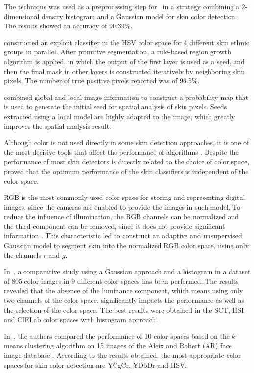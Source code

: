 The technique was used as a preprocessing step for~\citet{tan:12} in a strategy combining a $2$-dimensional density histogram and a Gaussian model for skin color detection. The results showed an accuracy of 90.39\%.

\citet{naji:12} constructed an explicit classifier in the HSV color space for 4 different skin ethnic groups in parallel. After primitive segmentation, a rule-based region growth algorithm is applied, in which the output of the first layer is used as a seed, and then the final mask in other layers is constructed iteratively by neighboring skin pixels. The number of true positive pixels reported was of 96.5\%.

\citet{kawulok:13} combined global and local image information to construct a probability map that is used to generate the initial seed for spatial analysis of skin pixels. Seeds extracted using a local model are highly adapted to the image, which greatly improves the spatial analysis result.

Although color is not used directly in some skin detection approaches, it is one of the most decisive tools that affect the performance of algorithms \citep{mahmoodi:16}. Despite the performance of most skin detectors is directly related to the choice of color space, \citet{albiol:01} proved that the optimum performance of the skin classifiers is independent of the color space.

RGB is the most commonly used color space for storing and representing digital images, since the cameras are enabled to provide the images in such model. To reduce the influence of illumination, the RGB channels can be normalized and the third component can be removed, since it does not provide significant information \citep{kakumanu:07}. This characteristic led \citet{bergasa:00} to construct an adaptive and unsupervised Gaussian model to segment skin into the normalized RGB color space, using only the channels $r$ and $g$.

In~\citet{jayaram:04}, a comparative study using a Gaussian approach and a histogram in a dataset of 805 color images in 9 different color spaces has been performed. The results revealed that the absence of the luminance component, which means using only two channels of the color space, significantly impacts the performance as well as the selection of the color space. The best results were obtained in the SCT, HSI and CIELab color spaces with histogram approach.

In~\citet{chaves:10}, the authors compared the performance of 10 color spaces based on the $k$-means clustering algorithm on 15 images of the Aleix and Robert (AR) face image database \citep{ar-face-database:98}. According to the results obtained, the most appropriate color spaces for skin color detection are YCgCr, YDbDr and HSV.

